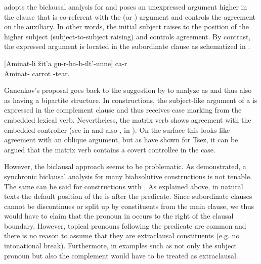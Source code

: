 \citet{GanenkovForthcoming} adopts the biclausal analysis for  and poses an unexpressed  argument higher in the clause that is co-referent with the  (or ) argument and controls the agreement on the  auxiliary. In other words, the initial  subject raises to the position of the higher  subject (subject-to-subject raising) and controls  agreement. By contrast, the expressed  argument is located in the subordinate clause as schematized in . 

\begin{exe}
	\ex	\label{ex:Aminat is tearing out a carrot from}
	\gll	 \textunderscore\raisebox{-.4ex}{\scriptsize i}\emph{}	[Aminat-li\raisebox{-.4ex}{\scriptsize i}	žit'a	gu-r-ha-b-ilt'-unne]	ca-r\\
		{} Aminat-	carrot	-tear.  \\
	\glt	{}
\end{exe}

Ganenkov's proposal goes back to the suggestion by \citet{Sumbatova2010} to analyze  as  and thus also as having a bipartite structure. In  constructions, the subject-like argument of a  is expressed in the complement clause and thus receives case marking from the embedded lexical verb. Nevertheless, the matrix verb shows agreement with the embedded controller (see  in  and also ,  in ). On the surface this looks like agreement with an oblique argument, but as \citet{Polinsky.Potsdam2002, Polinsky.Potsdam2006} have shown for Tsez, it can be argued that the matrix verb contains a covert controllee in the  case.

However, the biclausal approach seems to be problematic. As \citet{Forker2012a} demonstrated, a synchronic biclausal analysis for many biabsolutive constructions is not tenable. The same can be said for constructions with . As explained above, in natural texts the default position of the  is after the predicate. Since subordinate clauses cannot be discontinues or split up by constituents from the main clause, we thus would have to claim that the pronoun in  occurs to the right of the clausal boundary. However, topical pronouns following the predicate are common and there is no reason to assume that they are extraclausal constituents (e.g. no intonational break). Furthermore, in examples such as  not only the subject pronoun but also the complement would have to be treated as extraclausal. 

